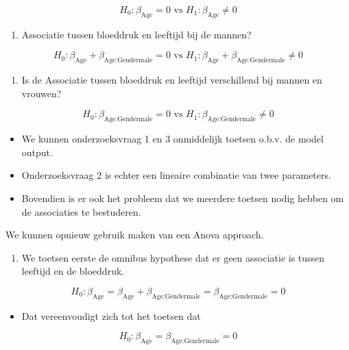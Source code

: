 \documentclass[
  12pt,dutch,coursenotes]{book}
\providecommand{\tightlist}{%
  \setlength{\itemsep}{0pt}\setlength{\parskip}{0pt}}
\theoremstyle{definition}
\theoremstyle{definition}
\theoremstyle{definition}
\theoremstyle{remark}
\begin{document}
\[
H_0: \beta_\text{Age} = 0 \text{ vs } H_1: \beta_\text{Age} \neq 0
\]

\begin{enumerate}
\def\labelenumi{\arabic{enumi}.}
\setcounter{enumi}{1}
\tightlist
\item
  Associatie tussen bloeddruk en leeftijd bij de mannen?
\end{enumerate}

\[
H_0: \beta_\text{Age} + \beta_\text{Age:Gendermale} = 0 \text{ vs } H_1: \beta_\text{Age} + \beta_\text{Age:Gendermale} \neq 0
\]

\begin{enumerate}
\def\labelenumi{\arabic{enumi}.}
\setcounter{enumi}{2}
\tightlist
\item
  Is de Associatie tussen bloeddruk en leeftijd verschillend bij mannen en vrouwen?
\end{enumerate}

\[H_0: \beta_\text{Age:Gendermale} = 0 \text{ vs } H_1: \beta_\text{Age:Gendermale} \neq 0
\]

\begin{itemize}
\tightlist
\item
  We kunnen onderzoeksvraag 1 en 3 onmiddelijk toetsen o.b.v. de model output.
\item
  Onderzoeksvraag 2 is echter een lineaire combinatie van twee parameters.
\item
  Bovendien is er ook het probleem dat we meerdere toetsen nodig hebben om de associaties te bestuderen.
\end{itemize}

We kunnen opnieuw gebruik maken van een Anova approach.

\begin{enumerate}
\def\labelenumi{\arabic{enumi}.}
\tightlist
\item
  We toetsen eerste de omnibus hypothese dat er geen associatie is tussen leeftijd en de bloeddruk.
\end{enumerate}

\[
H_0: \beta_\text{Age} = \beta_\text{Age} + \beta_\text{Age:Gendermale} = \beta_\text{Age:Gendermale} = 0
\]

\begin{itemize}
\tightlist
\item
  Dat vereenvoudigt zich tot het toetsen dat
\end{itemize}

\[
H_0: \beta_\text{Age} = \beta_\text{Age:Gendermale} = 0
\]
\end{document}
